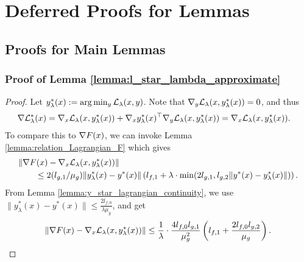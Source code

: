 
\section{Deferred Proofs for Lemmas}
\label{appendix:deferred_proof}

\subsection{Proofs for Main Lemmas}
\subsubsection{Proof of Lemma \ref{lemma:l_star_lambda_approximate}}
\begin{proof}
    Let $y^*_\lambda(x) := \arg\min_y \mathcal{L}_{\lambda}(x,y)$. Note that $\nabla_y \mathcal{L}_{\lambda} (x,y^*_\lambda(x)) = 0$, and thus
    \begin{align*}
        \nabla \mathcal{L}_{\lambda}^* (x) &= \nabla_x \mathcal{L}_{\lambda} (x, y_{\lambda}^*(x)) + \nabla_x y_{\lambda}^*(x)^\top \nabla_y \mathcal{L}_{\lambda} (x, y_{\lambda}^*(x)) =  \nabla_x \mathcal{L}_{\lambda} (x, y_{\lambda}^*(x)).
    \end{align*}
    To compare this to $\nabla F(x)$, we can invoke Lemma \ref{lemma:relation_Lagrangian_F} which gives
    \begin{align*}
        &\| \nabla F(x) - \nabla_x \mathcal{L}_\lambda(x,y_{\lambda}^*(x) )  \| \\
        &\qquad \le 2 (l_{g,1}/\mu_g) \|y_{\lambda}^*(x) - y^*(x)\| \left(l_{f,1} + \lambda \cdot \min(2l_{g,1}, l_{g,2} \|y^*(x) -  y_{\lambda}^*(x)\|)\right).
    \end{align*}
    From Lemma \ref{lemma:y_star_lagrangian_continuity}, we use $\|y_{\lambda}^*(x) - y^*(x)\| \le \frac{2l_{f,0}}{\lambda\mu_g}$, and get
    \begin{align*}
        \| \nabla F(x) - \nabla_x \mathcal{L}_\lambda(x,y_{\lambda}^*(x) )  \| \le \frac{1}{\lambda} \cdot \frac{4l_{f,0} l_{g,1}}{\mu_g^2} \left( l_{f,1} + \frac{2  l_{f,0} l_{g,2}}{\mu_g} \right). 
    \end{align*}
\end{proof}




